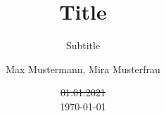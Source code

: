 \author{
	Max Mustermann,
	Mira Musterfrau
}
\titlehead{titlehead}
\subject{Subject}
\title{Title}
\subtitle{Subtitle}
\date{\st{01.01.2021}\\\today}
